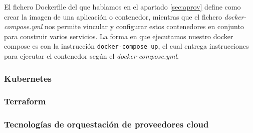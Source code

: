 	El fichero Dockerfile del que hablamos en el apartado \ref{sec:aprov} define como crear la imagen de una aplicación o contenedor, mientras que el fichero \textit{docker-compose.yml} nos permite vincular y configurar estos contenedores en conjunto para construir varios servicios. La forma en que ejecutamos nuestro docker compose es con la instrucción \texttt{docker-compose up}, el cual entrega instrucciones para ejecutar el contenedor según el \textit{docker-compose.yml}.

\subsubsection{Kubernetes}
	

\subsubsection{Terraform}
\subsubsection{Tecnologías de orquestación de proveedores cloud}
